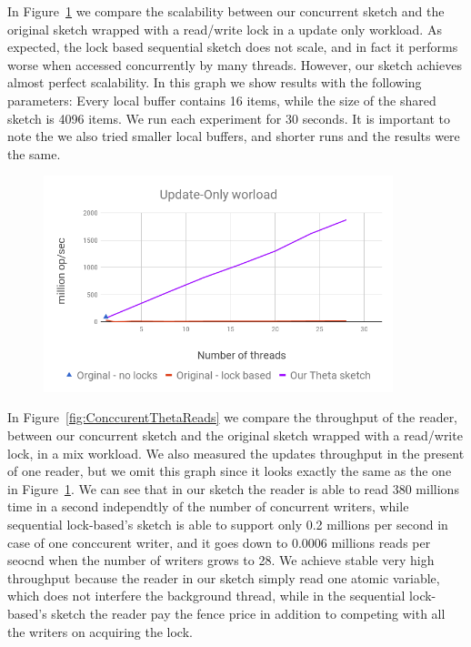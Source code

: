 In Figure~\ref{fig:ConccurentTheta} we compare the scalability
between our concurrent sketch and the original sketch wrapped
with a read/write lock in a update only workload.
As expected, the lock based sequential sketch does not scale, and
in fact it performs worse when accessed concurrently by many
threads.
However, our sketch achieves almost perfect scalability.
In this graph we show results with the following parameters:
Every local buffer contains 16 items, while the size of the
shared sketch is 4096 items.
We run each experiment for 30 seconds.
It is important to note the we also tried smaller local buffers,
and shorter runs and the results were the same.

\begin{figure}[h]
  \centering
  \includegraphics*[width=4in]{images/concurrentThetaGraph}
  \caption{}
   \label{fig:ConccurentTheta}
\end{figure}




In Figure~\ref{fig:ConccurentThetaReads} we compare the
throughput of the reader, between
our concurrent sketch and the original sketch wrapped with a
read/write lock, in a mix workload.
We also measured the updates throughput in the present of one
reader, but we omit this graph since it looks exactly the same as
the one in Figure~\ref{fig:ConccurentTheta}.
We can see that in our sketch the reader is able to read 380
millions time in a second independtly of the number of concurrent
writers, while sequential lock-based's sketch is able to support
only 0.2 millions per second in case of one conccurent writer,
and it goes down to 0.0006 millions reads per seocnd when the
number of writers grows to 28.
We achieve stable very high throughput because the reader in our
sketch simply read one atomic variable, which does not
interfere the background thread, while in the sequential
lock-based's sketch the reader pay the fence price in addition
to competing with all the writers on acquiring the lock.  



